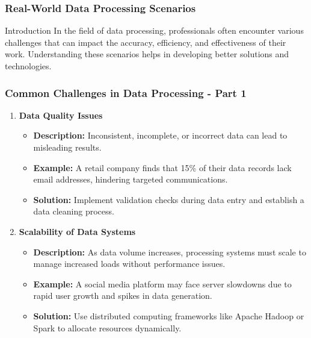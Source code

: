 \documentclass[aspectratio=169]{beamer}
\begin{document}
\begin{frame}[fragile]
    \frametitle{Real-World Data Processing Scenarios}
    \begin{block}{Introduction}
        In the field of data processing, professionals often encounter various challenges that can impact the accuracy, efficiency, and effectiveness of their work. Understanding these scenarios helps in developing better solutions and technologies.
    \end{block}
\end{frame}

\begin{frame}[fragile]
    \frametitle{Common Challenges in Data Processing - Part 1}
    \begin{enumerate}
        \item \textbf{Data Quality Issues}
        \begin{itemize}
            \item \textbf{Description:} Inconsistent, incomplete, or incorrect data can lead to misleading results.
            \item \textbf{Example:} A retail company finds that 15\% of their data records lack email addresses, hindering targeted communications.
            \item \textbf{Solution:} Implement validation checks during data entry and establish a data cleaning process.
        \end{itemize}
        
        \item \textbf{Scalability of Data Systems}
        \begin{itemize}
            \item \textbf{Description:} As data volume increases, processing systems must scale to manage increased loads without performance issues.
            \item \textbf{Example:} A social media platform may face server slowdowns due to rapid user growth and spikes in data generation.
            \item \textbf{Solution:} Use distributed computing frameworks like Apache Hadoop or Spark to allocate resources dynamically.
        \end{itemize}
    \end{enumerate}
\end{frame}
\end{document}

